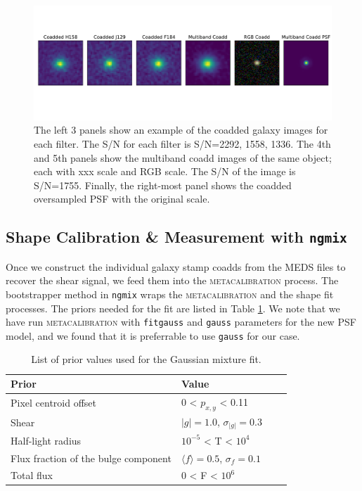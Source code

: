 {\begin{figure}
	\includegraphics[width=\textwidth]{figure4_og.pdf}
    \vspace*{-20mm}
    \caption{The left 3 panels show an example of the coadded galaxy images for each filter. The S/N for each filter is S/N=2292, 1558, 1336. The 4th and 5th panels show the multiband coadd images of the same object; each with xxx scale and RGB scale. The S/N of the image is S/N=1755. Finally, the right-most panel shows the coadded oversampled PSF with the original scale.}
    \label{fig:single_to_coadd_rgb}
\end{figure}

\par

\subsection{Shape Calibration \& Measurement with \texttt{ngmix}}
\label{subsec:mcal}
Once we construct the individual galaxy stamp coadds from the MEDS files to recover the shear signal, we feed them into the \textsc{metacalibration} process. The bootstrapper method in \texttt{ngmix} wraps the \textsc{metacalibration} and the shape fit processes. The priors needed for the fit are listed in Table \ref{tab:priors}. We note that we have run \textsc{metacalibration} with \texttt{fitgauss} and \texttt{gauss} parameters for the new PSF model, and we found that it is preferrable to use \texttt{gauss} for our case.

\begin{table}
    \centering
    \begin{tabular}{|p{3cm}||p{3cm}|p{3cm}|p{3cm}|}
    \hline
    Prior & Value \\
    \hline
    Pixel centroid offset & 0 < $p_{x,y}$ < 0.11\\
    Shear & $|g|=1.0$, $\sigma_{|g|} = 0.3$\\
    Half-light radius & $10^{-5}$ < T < $10^{4}$\\
    Flux fraction of the bulge component & $\langle f\rangle = 0.5$, $\sigma_{f} = 0.1$\\
    Total flux & $0$ < F < $10^{6}$\\
    \hline
    \end{tabular}
    \caption{List of prior values used for the Gaussian mixture fit.}
    \label{tab:priors}
\end{table}

}
